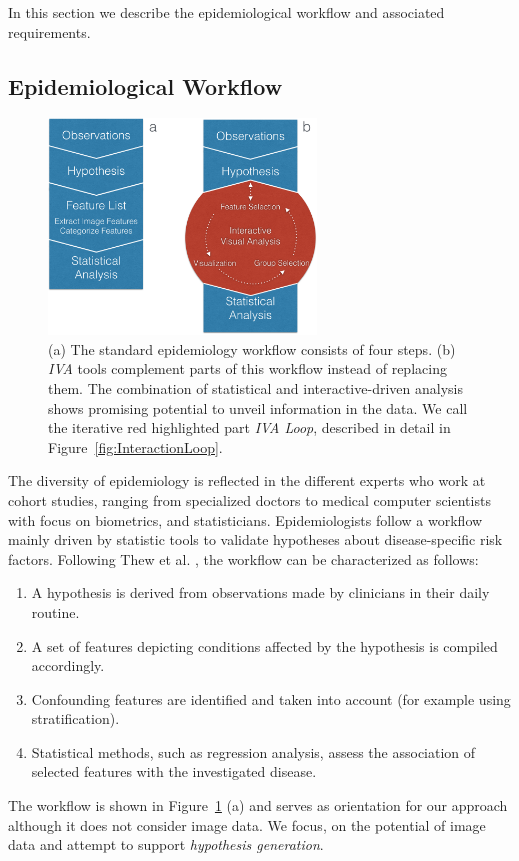 \documentclass[journal]{style/vgtc} 			          %
\begin{document}
In this section we describe the epidemiological workflow and associated requirements.

\subsection{Epidemiological Workflow} \label{EpidemiologicalWorkflow}
\begin{figure}[htb]
 \centering
 \includegraphics[width=2.8in]{figures/workflow_comparison}
 \caption{
 (a) The standard epidemiology workflow consists of four steps.
 (b) \emph{IVA} tools complement parts of this workflow instead of replacing them.
 The combination of statistical and interactive-driven analysis shows promising potential to unveil information in the data.
 We call the iterative red highlighted part \emph{IVA Loop}, described in detail in Figure~\ref{fig:InteractionLoop}.
 }
  \label{fig:WorkflowComparison}
\end{figure}
The diversity of epidemiology is reflected in the different experts who work at cohort studies, ranging from specialized doctors to medical computer scientists with focus on biometrics, and statisticians.
%
Epidemiologists follow a workflow mainly driven by statistic tools to validate hypotheses about disease-specific risk factors.
%
Following Thew et al. \cite{Thew2009}, the workflow can be characterized as follows:
%
\begin{enumerate}
	\item A hypothesis is derived from observations made by clinicians in their daily routine.
%
	\item A set of features depicting conditions affected by the hypothesis is compiled accordingly.
%
	\item Confounding features are identified and taken into account (for example using stratification).
%
	\item Statistical methods, such as regression analysis, assess the association of selected features with the investigated disease.
%
\end{enumerate}
The workflow is shown in Figure~\ref{fig:WorkflowComparison} (a) and serves as orientation for our approach although it does not consider image data.
%
We focus, on the potential of image data and attempt to support \emph{hypothesis generation}.
\end{document}
